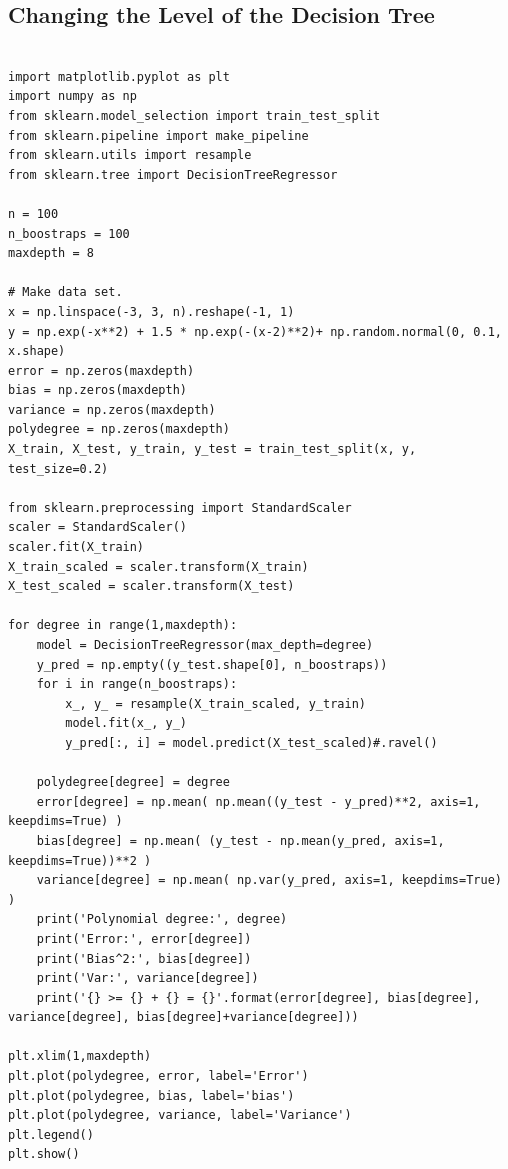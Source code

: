 \documentclass[%
oneside,                 %
final,                   %
10pt]{article}
\begin{document}
\subsection*{Changing the Level of the Decision Tree}

\begin{verbatim}

import matplotlib.pyplot as plt
import numpy as np
from sklearn.model_selection import train_test_split
from sklearn.pipeline import make_pipeline
from sklearn.utils import resample
from sklearn.tree import DecisionTreeRegressor

n = 100
n_boostraps = 100
maxdepth = 8

# Make data set.
x = np.linspace(-3, 3, n).reshape(-1, 1)
y = np.exp(-x**2) + 1.5 * np.exp(-(x-2)**2)+ np.random.normal(0, 0.1, x.shape)
error = np.zeros(maxdepth)
bias = np.zeros(maxdepth)
variance = np.zeros(maxdepth)
polydegree = np.zeros(maxdepth)
X_train, X_test, y_train, y_test = train_test_split(x, y, test_size=0.2)

from sklearn.preprocessing import StandardScaler
scaler = StandardScaler()
scaler.fit(X_train)
X_train_scaled = scaler.transform(X_train)
X_test_scaled = scaler.transform(X_test)

for degree in range(1,maxdepth):
    model = DecisionTreeRegressor(max_depth=degree) 
    y_pred = np.empty((y_test.shape[0], n_boostraps))
    for i in range(n_boostraps):
        x_, y_ = resample(X_train_scaled, y_train)
        model.fit(x_, y_)
        y_pred[:, i] = model.predict(X_test_scaled)#.ravel()

    polydegree[degree] = degree
    error[degree] = np.mean( np.mean((y_test - y_pred)**2, axis=1, keepdims=True) )
    bias[degree] = np.mean( (y_test - np.mean(y_pred, axis=1, keepdims=True))**2 )
    variance[degree] = np.mean( np.var(y_pred, axis=1, keepdims=True) )
    print('Polynomial degree:', degree)
    print('Error:', error[degree])
    print('Bias^2:', bias[degree])
    print('Var:', variance[degree])
    print('{} >= {} + {} = {}'.format(error[degree], bias[degree], variance[degree], bias[degree]+variance[degree]))

plt.xlim(1,maxdepth)
plt.plot(polydegree, error, label='Error')
plt.plot(polydegree, bias, label='bias')
plt.plot(polydegree, variance, label='Variance')
plt.legend()
plt.show()




\end{verbatim}
\end{document}
